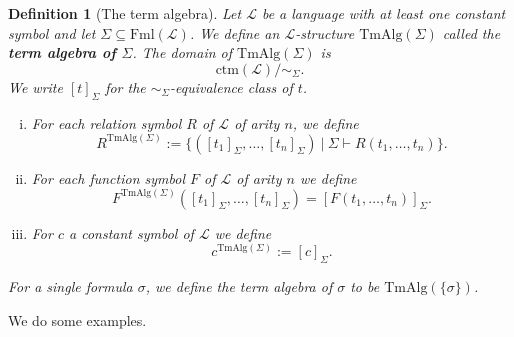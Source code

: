 \documentclass[11pt]{article}
\newcommand{\TmAlg}{\mathrm{TmAlg}}
\newcommand{\proves}{\vdash}
\newcommand{\ctm}{\textrm{ctm}}
\newcommand{\Fml}{\textrm{Fml}}
\newtheorem{definition}[theorem]{Definition}
\newcommand{\mcal}[1]{\mathcal{#1}}
\newcommand{\st}{\ \vert \ }
\begin{document}
\begin{definition}[The term algebra]
Let $\mcal{L}$ be a language with at least one constant symbol and let $\Sigma\subseteq \Fml(\mcal{L})$. We define an $\mcal{L}$-structure $\TmAlg(\Sigma)$ called the \textbf{term algebra of $\Sigma$}. The domain of $\TmAlg(\Sigma)$ is
\[\ctm(\mcal{L})/\sim_\Sigma.\]
We write $[t]_\Sigma$ for the $\sim_\Sigma$-equivalence class of $t$.

\begin{enumerate}[(i)]
\item For each relation symbol $R$ of $\mcal{L}$ of arity $n$, we define
\[R^{\TmAlg(\Sigma)}:=\{([t_1]_\Sigma,\ldots,[t_n]_\Sigma)\st \Sigma\proves R(t_1,\ldots,t_n)\}.\]
\item For each function symbol $F$ of $\mcal{L}$ of arity $n$ we define
\[F^{\TmAlg(\Sigma)}([t_1]_\Sigma,\ldots,[t_n]_\Sigma)=[F(t_1,\ldots,t_n)]_\Sigma.\]
\item For $c$ a constant symbol of $\mcal{L}$ we define
\[c^{\TmAlg(\Sigma)}:=[c]_\Sigma.\]
\end{enumerate}
For a single formula $\sigma$, we define the term algebra of $\sigma$ to be $\TmAlg(\{\sigma\})$.
\end{definition}

We do some examples.
\end{document}
